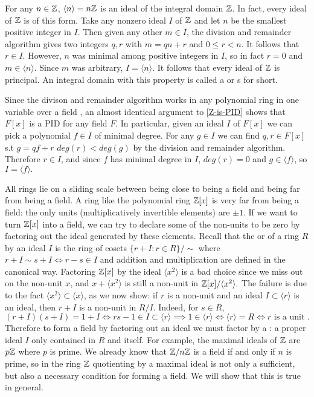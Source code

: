 \begin{example}\label{Z-is-PID}
For any $n\in \mathbb{Z}$, $\langle n\rangle =n\mathbb{Z}$ is an ideal of the integral domain $\mathbb{Z}$. In fact, every ideal of $\mathbb{Z}$ is of this form. Take any nonzero ideal $I$ of $\mathbb{Z}$ and let $n$ be the smallest positive integer in $I$. Then given any other $m\in I$, the division and remainder algorithm gives two integers $q,r$ with $m=qn+r$ and $0\leq r<n$. It follows that $r\in I$. However, $n$ was minimal among positive integers in $I$, so in fact $r=0$ and $m\in \langle n \rangle$. Since $m$ was arbitrary, $I=\langle n \rangle.$ It follows that every ideal of $\mathbb{Z}$ is principal. An integral domain with this property is called a  or s for short. 
\end{example}
\begin{example}\label{F[x]-PID} Since the divison and remainder algorithm works in any polynomial ring in one variable over a field \cite{HonoursAlgebra}, an almost identical argument to \cref{Z-is-PID} shows that $F[x]$ is a PID for any field $F$. In particular, given an ideal $I$ of $F[x]$ we can pick a polynomial $f\in I$ of minimal degree. For any $g\in I$ we can find $q,r\in F[x]$ s.t $g=qf+r$ $deg(r)<deg(g)$ by the division and remainder algorithm. Therefore $r\in I$, and since $f$ has minimal degree in $I$, $deg(r)=0$ and $g\in \langle f\rangle$, so $I=\langle f \rangle.$
\end{example}

All rings lie on a sliding scale between being close to being a field and being far from being a field. A ring like the polynomial ring $\mathbb{Z}[x]$ is very far from being a field: the only units (multiplicatively invertible elements) are $\pm 1$. If we want to turn $\mathbb{Z}[x]$ into a field, we can try to declare some of the non-units to be zero by factoring out the ideal generated by these elements. Recall that the  or  of a ring $R$ by an ideal $I$ is the ring of cosets $\{r+I:r\in R\}/\sim$ where $r+I\sim s+I\iff r-s\in I$ and addition and multiplication are defined in the canonical way. Factoring $\mathbb{Z}[x]$ by the ideal $\langle x^2\rangle$ is a bad choice since we miss out on the non-unit $x$, and $x+\langle x^2\rangle$ is still a non-unit in $\mathbb{Z}[x]/\langle x^2 \rangle.$ The failure is due to the fact $\langle x^2\rangle\subset \langle x \rangle$, as we now show: if $r$ is a non-unit and an ideal $I\subset \langle r \rangle$ is an ideal, then $r+I$ is a non-unit in $R/I.$ Indeed, for $s\in R$,
$$(r+I)(s+I)=1+I \iff rs-1\in I\subset \langle r \rangle \implies 1\in \langle r \rangle \iff \langle r \rangle = R\iff r \text{ is a unit }.$$
Therefore to form a field by factoring out an ideal we must factor by a : a proper ideal $I$ only contained in $R$ and itself. For example, the maximal ideals of $\mathbb{Z}$ are $p\mathbb{Z}$ where $p$ is prime. We already know that $\mathbb{Z}/n\mathbb{Z}$ is a field if and only if $n$ is prime, so in the ring $\mathbb{Z}$ quotienting by a maximal ideal is not only a sufficient, but also a necessary condition for forming a field. We will show that this is true in general.

